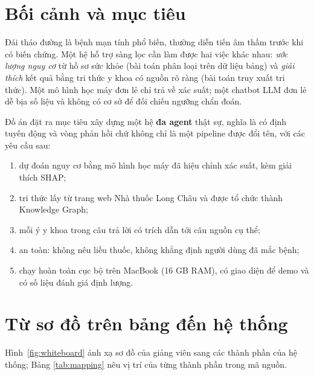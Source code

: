 \documentclass[12pt,a4paper]{report}
\begin{document}
\section{Bối cảnh và mục tiêu}
Đái tháo đường là bệnh mạn tính phổ biến, thường diễn tiến âm thầm trước khi có biến chứng.
Một hệ hỗ trợ sàng lọc cần làm được hai việc khác nhau: \emph{ước lượng nguy cơ} từ hồ sơ sức
khỏe (bài toán phân loại trên dữ liệu bảng) và \emph{giải thích} kết quả bằng tri thức y khoa
có nguồn rõ ràng (bài toán truy xuất tri thức). Một mô hình học máy đơn lẻ chỉ trả về xác suất;
một chatbot LLM đơn lẻ dễ bịa số liệu và không có cơ sở để đối chiếu ngưỡng chẩn đoán.

Đồ án đặt ra mục tiêu xây dựng một hệ \textbf{đa agent} thật sự, nghĩa là có định tuyến động
và vòng phản hồi chứ không chỉ là một pipeline được đổi tên, với các yêu cầu sau:
\begin{enumerate}[leftmargin=*]
    \item dự đoán nguy cơ bằng mô hình học máy đã hiệu chỉnh xác suất, kèm giải thích SHAP;
    \item tri thức lấy từ trang web Nhà thuốc Long Châu và được tổ chức thành Knowledge Graph;
    \item mỗi ý y khoa trong câu trả lời có trích dẫn tới câu nguồn cụ thể;
    \item an toàn: không nêu liều thuốc, không khẳng định người dùng đã mắc bệnh;
    \item chạy hoàn toàn cục bộ trên MacBook (16 GB RAM), có giao diện để demo và có số liệu
          đánh giá định lượng.
\end{enumerate}

\section{Từ sơ đồ trên bảng đến hệ thống}
Hình~\ref{fig:whiteboard} ánh xạ sơ đồ của giảng viên sang các thành phần của hệ thống; Bảng
\ref{tab:mapping} nêu vị trí của từng thành phần trong mã nguồn.
\end{document}
